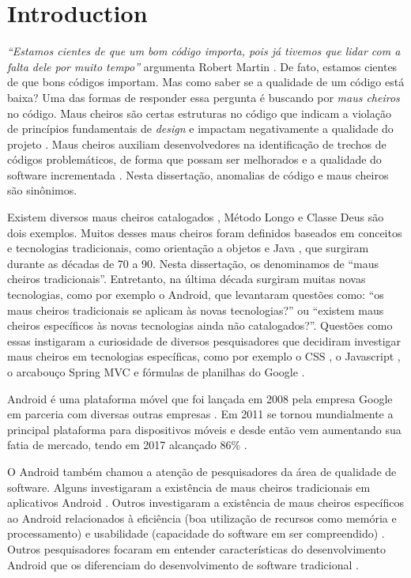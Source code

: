 
\section{Introduction}

\emph{``Estamos cientes de que um bom código importa, pois já tivemos que lidar com a falta dele por muito tempo''} argumenta Robert Martin \cite{CleanCode:08}. De fato, estamos cientes de que bons códigos importam. Mas como saber se a qualidade de um código está baixa? Uma das formas de responder essa pergunta é buscando por \emph{maus cheiros} no código. Maus cheiros são certas estruturas no código que indicam a violação de princípios fundamentais de \textit{design} e impactam negativamente a qualidade do projeto \cite[p.~258]{Refactoring:14}. Maus cheiros auxiliam desenvolvedores na identificação de trechos de códigos problemáticos, de forma que possam ser melhorados e a qualidade do software incrementada \cite{Refactoring:99}. Nesta dissertação, anomalias de código e maus cheiros são sinônimos.

Existem diversos maus cheiros catalogados \cite{Refactoring:99, CleanCode:08, Refactoring:14, Webster:95}, Método Longo e Classe Deus são dois exemplos. Muitos desses maus cheiros foram definidos baseados em conceitos e tecnologias tradicionais, como orientação a objetos e Java \cite{Java}, que surgiram durante as décadas de 70 a 90. Nesta dissertação, os denominamos de ``maus cheiros tradicionais''. Entretanto, na última década surgiram muitas novas tecnologias, como por exemplo o Android, que levantaram questões como: ``os maus cheiros tradicionais se aplicam às novas tecnologias?'' ou ``existem maus cheiros específicos às novas tecnologias ainda não catalogados?''. Questões como essas instigaram a curiosidade de diversos pesquisadores que decidiram investigar maus cheiros em tecnologias específicas, como por exemplo o CSS \cite{CSSCodeSmell}, o Javascript \cite{JavascriptSmells}, o arcabouço Spring MVC \cite{MvcSmells:16} e fórmulas de planilhas do Google \cite{SpreadsheetsSmells:12}.

Android é uma plataforma móvel que foi lançada em 2008 pela empresa Google em parceria com diversas outras empresas \cite{OHAReleasesAndroidSDK:07}. Em 2011 se tornou mundialmente a principal plataforma para dispositivos móveis e desde então vem aumentando sua fatia de mercado, tendo em 2017 alcançado 86\% \cite{GlobalSmartphoneSales:09-17}. 

O Android também chamou a atenção de pesquisadores da área de qualidade de software. Alguns investigaram a existência de maus cheiros tradicionais em aplicativos Android \cite{Hecht:15, DomainMatters, MobileSmells:13}. Outros investigaram a existência de maus cheiros específicos ao Android relacionados à eficiência (boa utilização de recursos como memória e processamento) e usabilidade (capacidade do software em ser compreendido) \cite{RemovingEnergySmells:12, 30QualitySmells:14}. Outros pesquisadores focaram em entender características do desenvolvimento Android que os diferenciam do desenvolvimento de software tradicional \cite{Mantyla2013}.

